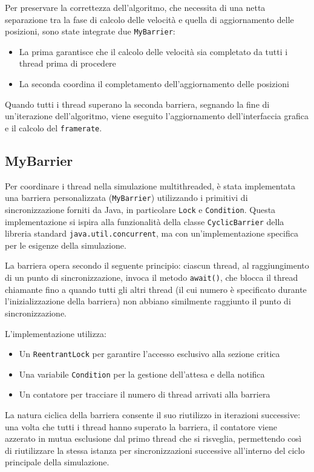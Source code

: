 \documentclass[a4paper,12pt]{report}
\begin{document}
Per preservare la correttezza dell'algoritmo, che necessita di una netta separazione tra la fase di calcolo delle velocità e quella di aggiornamento delle posizioni, sono state integrate due \texttt{MyBarrier}:
\begin{itemize}
    \item La prima garantisce che il calcolo delle velocità sia completato da tutti i thread prima di procedere
    \item La seconda coordina il completamento dell'aggiornamento delle posizioni
\end{itemize}

Quando tutti i thread superano la seconda barriera, segnando la fine di un'iterazione dell'algoritmo, viene eseguito l'aggiornamento dell'interfaccia grafica e il calcolo del \texttt{framerate}.

\subsection{MyBarrier}
Per coordinare i thread nella simulazione multithreaded, è stata implementata una barriera personalizzata (\texttt{MyBarrier}) utilizzando i primitivi di sincronizzazione forniti da Java, in particolare \texttt{Lock} e \texttt{Condition}. Questa implementazione si ispira alla funzionalità della classe \texttt{CyclicBarrier} della libreria standard \texttt{java.util.concurrent}, ma con un'implementazione specifica per le esigenze della simulazione.

La barriera opera secondo il seguente principio: ciascun thread, al raggiungimento di un punto di sincronizzazione, invoca il metodo \texttt{await()}, che blocca il thread chiamante fino a quando tutti gli altri thread (il cui numero è specificato durante l'inizializzazione della barriera) non abbiano similmente raggiunto il punto di sincronizzazione.

L'implementazione utilizza:
\begin{itemize}
    \item Un \texttt{ReentrantLock} per garantire l'accesso esclusivo alla sezione critica
    \item Una variabile \texttt{Condition} per la gestione dell'attesa e della notifica
    \item Un contatore per tracciare il numero di thread arrivati alla barriera
\end{itemize}

La natura ciclica della barriera consente il suo riutilizzo in iterazioni successive: una volta che tutti i thread hanno superato la barriera, il contatore viene azzerato in mutua esclusione dal primo thread che si risveglia, permettendo così di riutilizzare la stessa istanza per sincronizzazioni successive all'interno del ciclo principale della simulazione.
\end{document}
